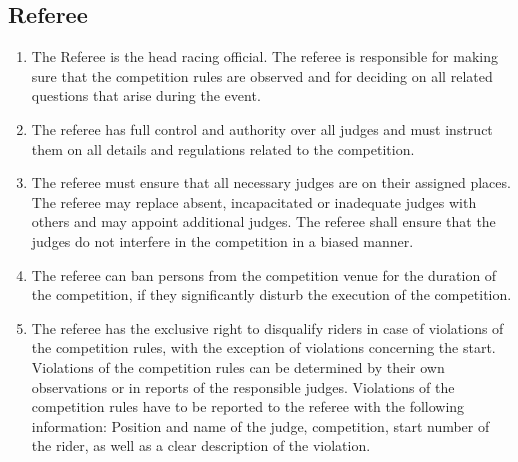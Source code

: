 \subsection{Referee}
	\begin{enumerate}[leftmargin=1.5em,labelsep=*]
		\item The Referee is the head racing official. 
		The referee is responsible for making sure that the competition rules are observed and for deciding on all related questions that arise during the event.
		\item The referee has full control and authority over all judges and must instruct them on all details and regulations related to the competition.
		\item The referee must ensure that all necessary judges are on their assigned places.
		The referee may replace absent, incapacitated or inadequate judges with others and may appoint additional judges.
		The referee shall ensure that the judges do not interfere in the competition in a biased manner.
		\item The referee can ban persons from the competition venue for the duration of the competition, if they significantly disturb the execution of the competition.
		\item The referee has the exclusive right to disqualify riders in case of violations of the competition rules, with the exception of violations concerning the start.
		Violations of the competition rules can be determined by their own observations or in reports of the responsible judges.
		Violations of the competition rules have to be reported to the referee with the following information: 
        Position and name of the judge, competition, start number of the rider, as well as a clear description of the violation.
	\end{enumerate}

